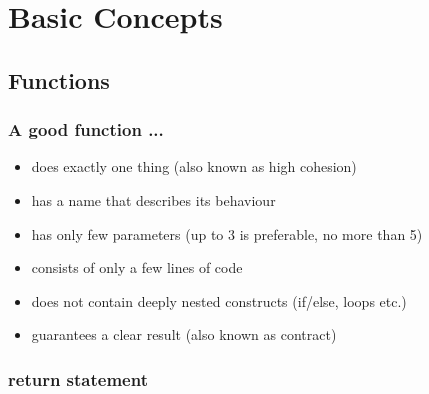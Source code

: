 
\section{Basic Concepts}

  \subsection{Functions}
    \subsubsection{A good function ...}
    \begin{itemize}
      \item does exactly one thing (also known as high cohesion)
      \item has a name that describes its behaviour
      \item has only few parameters (up to 3 is preferable, no more than 5)
      \item consists of only a few lines of code
      \item does not contain deeply nested constructs (if/else, loops etc.)
      \item guarantees a clear result (also known as contract)
    \end{itemize}
    \subsubsection{return statement}
